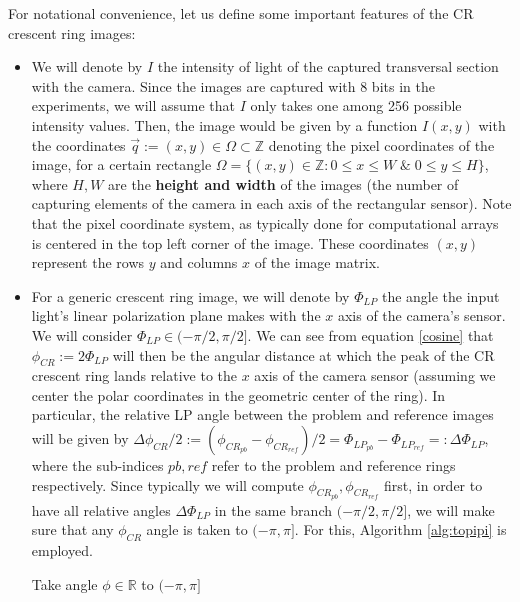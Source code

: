 \documentclass[11pt, a4paper, twoside]{article} %
\newcommand{\R}{\mathbb{R}} %
\begin{document}
For notational convenience, let us define some important features of the CR crescent ring images:\vspace{-0.3cm}
\begin{itemize}
\item We will denote by $I$ the intensity of light of the captured transversal section with the camera. Since the images are captured with 8 bits in the experiments, we will assume that $I$ only takes one among 256 possible intensity values. Then, the image would be given by a function $I(x,y)$ with the coordinates $\vec{q}:=(x,y)\in\Omega\subset \mathbb{Z}$ denoting the pixel coordinates of the image, for a certain rectangle $\Omega=\{(x,y)\in\mathbb{Z}:0\leq x\leq W\;\&\;0\leq y\leq H\}$, where $H,W$ are the {\bf height and width} of the images (the number of capturing elements of the camera in each axis of the rectangular sensor). Note that the pixel coordinate system, as typically done for computational arrays is centered in the top left corner of the image. These coordinates $(x,y)$ represent the rows $y$ and columns $x$ of the image matrix.

\item For a generic crescent ring image, we will denote by $\Phi_{LP}$ the angle the input light's linear polarization plane makes with the $x$ axis of the camera's sensor. We will consider $\Phi_{LP}\in(-\pi/2,\pi/2]$. We can see from equation \eqref{cosine} that $\phi_{CR}:=2\Phi_{LP}$ will then be the angular distance at which the peak of the CR crescent ring lands relative to the $x$ axis of the camera sensor (assuming we center the polar coordinates in the geometric center of the ring). In particular, the relative LP angle between the problem and reference images will be given by $\Delta \phi_{CR}/2:=(\phi_{CR_{pb}}-\phi_{CR_{ref}})/2=\Phi_{LP_{pb}}-\Phi_{LP_{ref}}=:\Delta \Phi_{LP}$, where the sub-indices $pb,ref$ refer to the problem and reference rings respectively. Since typically we will compute $\phi_{CR_{pb}},\phi_{CR_{ref}}$ first, in order to have all relative angles $\Delta \Phi_{LP}$ in the same branch $(-\pi/2,\pi/2]$, we will make sure that any $\phi_{CR}$ angle is taken to $(-\pi,\pi]$. For this, Algorithm \ref{alg:topipi} is employed.\vspace{-0.1cm}

\begin{algorithm}
{\small \caption{Take angle $\phi\in\R$ to $(-\pi,\pi]$}\label{alg:topipi}
}
\end{algorithm}
\vspace{-0.2cm}


\end{itemize}
\end{document}
